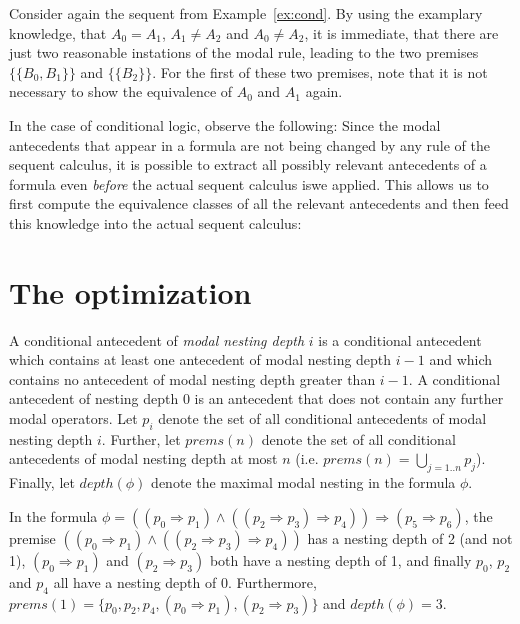 \documentclass{entcs} \usepackage{entcsmacro}
\begin{document}
\begin{example}
Consider again the sequent from Example~\ref{ex:cond}. By using the examplary
knowledge, that $A_0=A_1$, $A_1\neq A_2$ and $A_0\neq A_2$, it is immediate,
that there are just two reasonable instations of the modal rule, leading
to the two premises $\{\{B_0,B_1\}\}$ and $\{\{B_2\}\}$. For the
first of these two premises, note that it is not necessary to show the
equivalence of $A_0$ and $A_1$ again.
\end{example}


\begin{remark}
In the case of conditional logic, observe the following: Since the
modal antecedents that appear in a formula are not being changed by any
rule of the sequent calculus, it is possible to extract all possibly
relevant antecedents of a formula even \emph{before} the actual sequent
calculus iswe applied. This allows us to first compute the equivalence
classes of all the relevant antecedents and then feed this knowledge into
the actual sequent calculus:
\end{remark}

\section{The optimization}

\begin{definition}
A conditional antecedent of \emph{modal nesting depth} $i$ is a
conditional antecedent which contains at least one antecedent of
modal nesting depth $i-1$ and which contains no antecedent 
of modal nesting depth greater than $i-1$. A
conditional antecedent of nesting depth 0 is an antecedent
that does not contain any further modal operators.
Let $p_i$ denote the set of all conditional antecedents of modal
nesting depth $i$. Further, let $prems(n)$ denote the set of all
conditional antecedents of modal nesting depth at most $n$ (i.e.
$prems(n)=\bigcup_{j=1..n}^{} p_j$).
Finally, let $depth(\phi)$ denote the maximal modal nesting in
the formula $\phi$.
\end{definition}

\begin{example}
In the formula $\phi=((p_0\Rightarrow p_1) \wedge ((p_2\Rightarrow p_3)\Rightarrow p_4))
\Rightarrow (p_5\Rightarrow p_6)$,
the premise $((p_0\Rightarrow p_1) \wedge ((p_2\Rightarrow p_3)\Rightarrow p_4))$ has a
nesting depth of 2 (and not 1), $(p_0\Rightarrow p_1)$ and $(p_2\Rightarrow p_3)$ both
have a nesting depth of 1, and finally $p_0$, $p_2$ and $p_4$ all have a nesting depth of 0.
Furthermore, $prems(1)=\{p_0,p_2,p_4,(p_0\Rightarrow p_1),(p_2\Rightarrow p_3)\}$
and $depth(\phi)=3$.
\end{example}
\end{document}
